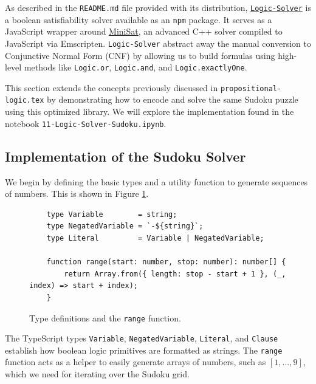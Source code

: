As described in the \texttt{README.md} file provided with its distribution,
\href{https://github.com/meteor/logic-solver}{\texttt{Logic-Solver}} is a boolean satisfiability solver
available as an \texttt{npm} package. It serves as a JavaScript wrapper around
\href{http://minisat.se/}{MiniSat}, an advanced C++ solver compiled to JavaScript via
Emscripten. \texttt{Logic-Solver} abstract away the manual conversion to Conjunctive Normal Form (CNF) by
allowing us to build formulas using high-level methods like \texttt{Logic.or}, \texttt{Logic.and}, and
\texttt{Logic.exactlyOne}. 

This section extends the concepts previously discussed in \texttt{propositional-logic.tex} by demonstrating how
to encode and solve the same Sudoku puzzle using this optimized library. We will explore the implementation
found in the notebook \texttt{11-Logic-Solver-Sudoku.ipynb}. 

\subsection{Implementation of the Sudoku Solver}
We begin by defining the basic types and a utility function to generate sequences of numbers. This is shown in
Figure \ref{fig:logicsolver-range}. 

\begin{figure}[!ht]
  \centering
\begin{verbatim}
    type Variable        = string;
    type NegatedVariable = `-${string}`; 
    type Literal         = Variable | NegatedVariable;
    
    function range(start: number, stop: number): number[] {
        return Array.from({ length: stop - start + 1 }, (_, index) => start + index);
    }
\end{verbatim}
\vspace*{-0.3cm}
  \caption{Type definitions and the \texttt{range} function.}
  \label{fig:logicsolver-range}
\end{figure} %

The TypeScript types \texttt{Variable}, \texttt{NegatedVariable}, \texttt{Literal}, and \texttt{Clause}
establish how boolean logic primitives are formatted as strings. The \texttt{range} function acts as a helper
to easily generate arrays of numbers, such as $[1, \dots, 9]$, which we need for iterating over the Sudoku
grid. 

